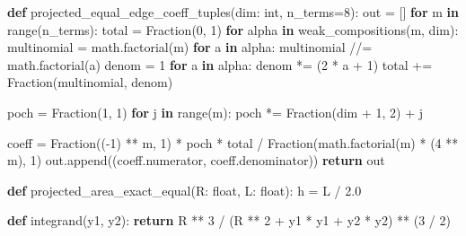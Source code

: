 \documentclass[
  12pt,
  a4paper,
]{article}
\newenvironment{Shaded}{}{}
\newcommand{\BuiltInTok}[1]{\textcolor[rgb]{0.00,0.50,0.00}{#1}}
\newcommand{\ControlFlowTok}[1]{\textcolor[rgb]{0.00,0.44,0.13}{\textbf{#1}}}
\newcommand{\DecValTok}[1]{\textcolor[rgb]{0.25,0.63,0.44}{#1}}
\newcommand{\FloatTok}[1]{\textcolor[rgb]{0.25,0.63,0.44}{#1}}
\newcommand{\KeywordTok}[1]{\textcolor[rgb]{0.00,0.44,0.13}{\textbf{#1}}}
\newcommand{\NormalTok}[1]{#1}
\newcommand{\OperatorTok}[1]{\textcolor[rgb]{0.40,0.40,0.40}{#1}}
\begin{document}
\begin{Shaded}
\begin{Highlighting}[]
\KeywordTok{def}\NormalTok{ projected\_equal\_edge\_coeff\_tuples(dim: }\BuiltInTok{int}\NormalTok{, n\_terms}\OperatorTok{=}\DecValTok{8}\NormalTok{):}
\NormalTok{    out }\OperatorTok{=}\NormalTok{ []}
    \ControlFlowTok{for}\NormalTok{ m }\KeywordTok{in} \BuiltInTok{range}\NormalTok{(n\_terms):}
\NormalTok{        total }\OperatorTok{=}\NormalTok{ Fraction(}\DecValTok{0}\NormalTok{, }\DecValTok{1}\NormalTok{)}
        \ControlFlowTok{for}\NormalTok{ alpha }\KeywordTok{in}\NormalTok{ weak\_compositions(m, dim):}
\NormalTok{            multinomial }\OperatorTok{=}\NormalTok{ math.factorial(m)}
            \ControlFlowTok{for}\NormalTok{ a }\KeywordTok{in}\NormalTok{ alpha:}
\NormalTok{                multinomial }\OperatorTok{//=}\NormalTok{ math.factorial(a)}
\NormalTok{            denom }\OperatorTok{=} \DecValTok{1}
            \ControlFlowTok{for}\NormalTok{ a }\KeywordTok{in}\NormalTok{ alpha:}
\NormalTok{                denom }\OperatorTok{*=}\NormalTok{ (}\DecValTok{2} \OperatorTok{*}\NormalTok{ a }\OperatorTok{+} \DecValTok{1}\NormalTok{)}
\NormalTok{            total }\OperatorTok{+=}\NormalTok{ Fraction(multinomial, denom)}

\NormalTok{        poch }\OperatorTok{=}\NormalTok{ Fraction(}\DecValTok{1}\NormalTok{, }\DecValTok{1}\NormalTok{)}
        \ControlFlowTok{for}\NormalTok{ j }\KeywordTok{in} \BuiltInTok{range}\NormalTok{(m):}
\NormalTok{            poch }\OperatorTok{*=}\NormalTok{ Fraction(dim }\OperatorTok{+} \DecValTok{1}\NormalTok{, }\DecValTok{2}\NormalTok{) }\OperatorTok{+}\NormalTok{ j}

\NormalTok{        coeff }\OperatorTok{=}\NormalTok{ Fraction((}\OperatorTok{{-}}\DecValTok{1}\NormalTok{) }\OperatorTok{**}\NormalTok{ m, }\DecValTok{1}\NormalTok{) }\OperatorTok{*}\NormalTok{ poch }\OperatorTok{*}\NormalTok{ total }\OperatorTok{/}\NormalTok{ Fraction(math.factorial(m) }\OperatorTok{*}\NormalTok{ (}\DecValTok{4} \OperatorTok{**}\NormalTok{ m), }\DecValTok{1}\NormalTok{)}
\NormalTok{        out.append((coeff.numerator, coeff.denominator))}
    \ControlFlowTok{return}\NormalTok{ out}


\KeywordTok{def}\NormalTok{ projected\_area\_exact\_equal(R: }\BuiltInTok{float}\NormalTok{, L: }\BuiltInTok{float}\NormalTok{):}
\NormalTok{    h }\OperatorTok{=}\NormalTok{ L }\OperatorTok{/} \FloatTok{2.0}

    \KeywordTok{def}\NormalTok{ integrand(y1, y2):}
        \ControlFlowTok{return}\NormalTok{ R }\OperatorTok{**} \DecValTok{3} \OperatorTok{/}\NormalTok{ (R }\OperatorTok{**} \DecValTok{2} \OperatorTok{+}\NormalTok{ y1 }\OperatorTok{*}\NormalTok{ y1 }\OperatorTok{+}\NormalTok{ y2 }\OperatorTok{*}\NormalTok{ y2) }\OperatorTok{**}\NormalTok{ (}\DecValTok{3} \OperatorTok{/} \DecValTok{2}\NormalTok{)}


\end{Highlighting}
\end{Shaded}
\end{document}
